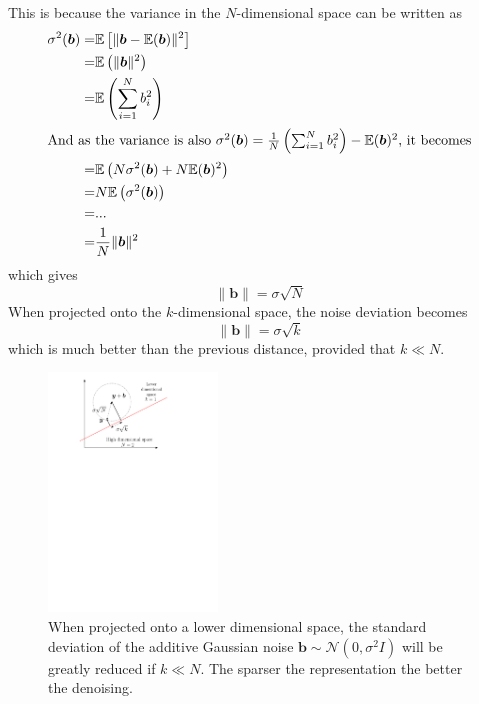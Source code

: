 \noindent
This is because the variance in the $N$-dimensional space can be written as
\begin{align*}
\sigma^2(\bm{b}) =& \mathbb{E}\left[\lVert \bm{b}-\mathbb{E}(\bm{b}) \rVert^2 \right]\\
=& \mathbb{E}\left(\lVert \bm{b} \rVert^2 \right)\\
=& \mathbb{E}\left(\sum^N_{i=1} b_i^2 \right)\\
\shortintertext{And as the variance is also $\sigma^2(\bm{b})= \frac{1}{N}\left(\sum_{i=1}^N b_i^2 \right) - \mathbb{E}(\bm{b})^2$, it becomes}
=& \mathbb{E} \left(N\sigma^2(\bm{b}) + N\mathbb{E}(\bm{b})^2\right)\\
=& N \mathbb{E} \left(\sigma^2(\bm{b})\right)\\
=& ... \\
=& \frac{1}{N}\lVert \bm{b} \rVert^2
\end{align*}
which gives 
\begin{equation*} \lVert \bm{b} \rVert = \sigma\sqrt{N} \end{equation*}
When projected onto the $k$-dimensional space, the noise deviation becomes
\begin{equation*}\lVert \bm{b} \rVert = \sigma\sqrt{k} \end{equation*}
which is much better than the previous distance, provided that $k \ll N$. 

\begin{figure}[!ht]\centering
\includegraphics[width=0.4\textwidth]{figures/sparse-reduce-noise.pdf}
\caption{When projected onto a lower dimensional space, the standard deviation of the additive Gaussian noise $\bm{b} \sim \mathcal{N}(0,\sigma^2I)$ will be greatly reduced if $k \ll N$. The sparser the representation the better the denoising.\label{sparse_reduce_noise}}
\end{figure}

